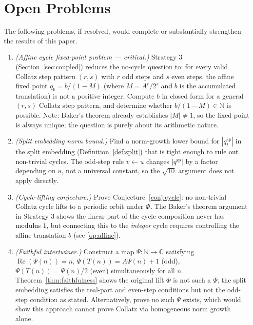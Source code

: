 \documentclass[12pt,reqno]{amsart}
\theoremstyle{plain}
\theoremstyle{definition}
\theoremstyle{remark}
\newcommand{\CC}{\mathbb{C}}
\newcommand{\NN}{\mathbb{N}}
\newcommand{\abs}[1]{\left|#1\right|}
\begin{document}
\section{Open Problems}
\label{sec:open}

The following problems, if resolved, would complete or substantially
strengthen the results of this paper.

\begin{enumerate}[label=\textbf{OP\arabic*.},ref=OP\arabic*]

\item \label{op:affine}
\emph{(Affine cycle fixed-point problem --- critical.)}
Strategy 3 (Section~\ref{sec:coupled}) reduces the no-cycle question
to: for every valid Collatz step pattern $(r, s)$ with $r$ odd steps
and $s$ even steps, the affine fixed point $q_0 = b/(1-M)$ (where
$M = A^r/2^s$ and $b$ is the accumulated translation) is not a positive
integer.  Compute $b$ in closed form for a general $(r,s)$ Collatz
step pattern, and determine whether $b/(1-M) \in \NN$ is possible.
Note: Baker's theorem already establishes $\abs{M} \neq 1$, so the
fixed point is always unique; the question is purely about its
arithmetic nature.

\item \label{op:split}
\emph{(Split embedding norm bound.)}
Find a norm-growth lower bound for $\abs{q_t^{\mathrm{sp}}}$ in the
split embedding (Definition~\ref{def:split}) that is tight enough to
rule out non-trivial cycles.  The odd-step rule $v \leftarrow u$
changes $\abs{q^{\mathrm{sp}}}$ by a factor depending on $u$, not a
universal constant, so the $\sqrt{10}$ argument does not apply directly.

\item \label{op:cycle}
\emph{(Cycle-lifting conjecture.)}
Prove Conjecture~\ref{conj:cycle}: no non-trivial Collatz cycle lifts
to a periodic orbit under $\Phi$.  The Baker's theorem argument in
Strategy 3 shows the linear part of the cycle composition never has
modulus $1$, but connecting this to the \emph{integer} cycle requires
controlling the affine translation $b$ (see \ref{op:affine}).

\item \label{op:faithful_extension}
\emph{(Faithful intertwiner.)}
Construct a map $\Psi : \NN \to \CC$ satisfying
$\operatorname{Re}(\Psi(n)) = n$, $\Psi(T(n)) = A\Psi(n)+1$ (odd),
$\Psi(T(n)) = \Psi(n)/2$ (even) simultaneously for all $n$.
Theorem~\ref{thm:faithfulness} shows the original lift $\Phi$ is not
such a $\Psi$; the split embedding satisfies the real-part and
even-step conditions but not the odd-step condition as stated.
Alternatively, prove no such $\Psi$ exists, which would show this
approach cannot prove Collatz via homogeneous norm growth alone.

\end{enumerate}
\end{document}
